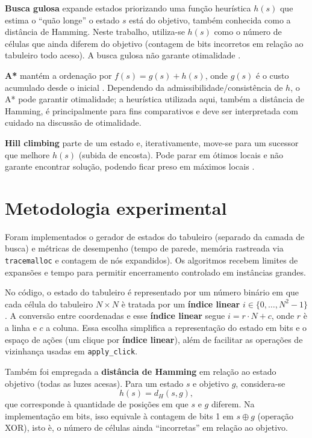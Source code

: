 \documentclass[12pt,a4paper]{article}
\begin{document}
\textbf{Busca gulosa} expande estados priorizando uma fun\c{c}\~ao heur\'istica $h(s)$ que estima o ``qu\~ao longe'' o estado $s$ est\'a do objetivo, também conhecida como a distância de Hamming. Neste trabalho, utiliza-se $h(s)$ como o n\'umero de c\'elulas que ainda diferem do objetivo (contagem de bits incorretos em rela\c{c}\~ao ao tabuleiro todo aceso). A busca gulosa n\~ao garante otimalidade \citep{russell2021}.

\textbf{A*} mant\'em a ordena\c{c}\~ao por $f(s)=g(s)+h(s)$, onde $g(s)$ \'e o custo acumulado desde o inicial \citep{hart1968,russell2021}. Dependendo da admissibilidade/consist\^encia de $h$, o A* pode garantir otimalidade; a heur\'istica utilizada aqui, também a distância de Hamming, \'e principalmente para fins comparativos e deve ser interpretada com cuidado na discuss\~ao de otimalidade.

\textbf{Hill climbing} parte de um estado e, iterativamente, move-se para um sucessor que melhore $h(s)$ (subida de encosta). Pode parar em \'otimos locais e n\~ao garante encontrar solu\c{c}\~ao, podendo ficar preso em máximos locais \citep{russell2021}.

\section{Metodologia experimental}

Foram implementados o gerador de estados do tabuleiro (separado da camada de busca) e m\'etricas de desempenho (tempo de parede, mem\'oria rastreada via \texttt{tracemalloc} e contagem de n\'os expandidos). Os algoritmos recebem limites de expans\~oes e tempo para permitir encerramento controlado em inst\^ancias grandes.

No c\'odigo, o estado do tabuleiro \'e representado por um n\'umero bin\'ario em que cada c\'elula do tabuleiro $N\times N$ \`e tratada por um \textbf{\'indice linear} $i \in \{0,\dots,N^2-1\}$. A convers\~ao entre coordenadas e esse \textbf{\'indice linear} segue $i = r\cdot N + c$, onde $r$ \`e a linha e $c$ a coluna. Essa escolha simplifica a representa\c{c}\~ao do estado em bits e o espa\c{c}o de a\c{c}\~oes (um clique por \textbf{\'indice linear}), al\'em de facilitar as opera\c{c}\~oes de vizinhan\c{c}a usadas em \texttt{apply\_click}.

Tamb\'em foi empregada a \textbf{dist\^ancia de Hamming} em rela\c{c}\~ao ao estado objetivo (todas as luzes acesas). Para um estado $s$ e objetivo $g$, considera-se
\[
h(s) = d_H(s,g),
\]
que corresponde \`a quantidade de posi\c{c}\~oes em que $s$ e $g$ diferem. Na implementa\c{c}\~ao em bits, isso equivale \`a contagem de bits 1 em $s \oplus g$ (opera\c{c}\~ao XOR), isto \`e, o n\'umero de c\'elulas ainda ``incorretas'' em rela\c{c}\~ao ao objetivo.
\end{document}
